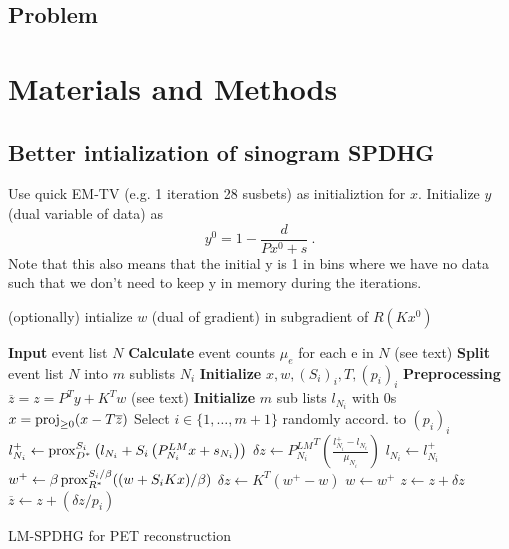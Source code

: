 \subsection{Problem}

\section{Materials and Methods}

\subsection{Better intialization of sinogram SPDHG}

Use quick EM-TV (e.g. 1 iteration 28 susbets) as initializtion for $x$.
Initialize $y$ (dual variable of data) as
\begin{equation}
y^0 = 1 - \frac{d}{Px^0 + s} \ .
\end{equation}
Note that this also means that the initial y is 1 in bins where we have
no data such that we don't need to keep y in memory during the iterations.

(optionally) intialize $w$ (dual of gradient) in subgradient of $R(Kx^0)$



\begin{algorithm}[t]
\begin{algorithmic}[1]
\small
\State \textbf{Input} event list $N$
\State \textbf{Calculate} event counts $\mu_e$ for each e in $N$ (see text)
\State \textbf{Split} event list $N$ into $m$ sublists $N_i$
\State \textbf{Initialize} $x,w,(S_i)_i,T,(p_i)_i$
\State \textbf{Preprocessing} $\overline{z} = z = P^T y + K^T w$ (see text)
\State \textbf{Initialize} $m$ sub lists $l_{N_i}$ with 0s
\Repeat
	\State $x = \operatorname{proj}_{\geq 0} (x - T \overline{z})$
	\State Select $i \in \{1,\ldots,m+1\}$ randomly accord. to $(p_i)_i$
	  \State $l_{N_i}^+ \gets \operatorname{prox}_{D^*}^{S_i} \left( l_{N_i} + S_i \left(P^{LM}_{N_i} x + s_{N_i} \right) \right)$
	  \State $\delta z \gets {P^{LM}_{N_i}}^T \left(\frac{l_{N_i}^+ - l_{N_i}}{\mu_{N_i}}\right)$
	  \State $l_{N_i} \gets l_{N_i}^+$
  \Else
	  \State $w^+ \gets \beta \operatorname{prox}_{R^*}^{S_i/\beta} ((w + S_i  K x)/\beta)$
	  \State $\delta z \gets K^T \left(w^+ - w\right)$
	  \State $w \gets w^+$
  \EndIf
	\State $z \gets z + \delta z$
	\State $\overline{z} \gets  z + (\delta z/p_i)$
\State {}
\end{algorithmic}
\caption{LM-SPDHG for PET reconstruction}
\label{alg:lmspdhg}
\end{algorithm}



